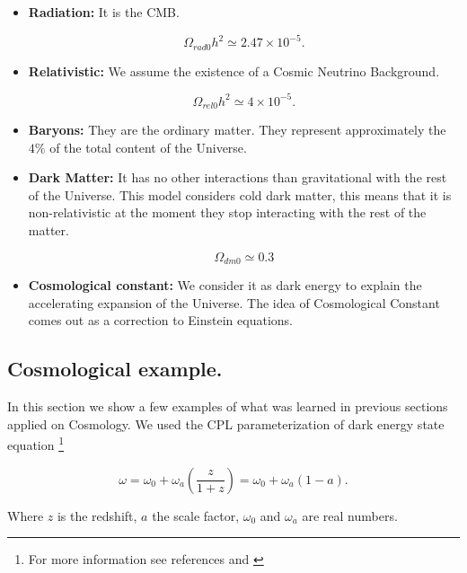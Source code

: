 \documentclass[onecolumn,           %
               showpacs,            %
               preprintnumbers,     %
               aps,                 %
               prl,          	    %
               letterpaper,             %
               superscriptaddress,      %
               nofootinbib,         %
               tightenlines,        %
               floats,floatfix      %
               ,usenatbib,
               ]{revtex4-1}
\begin{document}
\begin{itemize}
	\item \textbf{Radiation:} It is the CMB.
	
	\begin{equation}
	\Omega_{rad 0}h^2 \simeq 2.47 \times 10^{-5} .
	\end{equation}
	
	\item \textbf{Relativistic:} We assume the existence of a Cosmic Neutrino Background.
	
	\begin{equation}
	\Omega_{rel 0}h^2 \simeq 4 \times 10^{-5} .
	\end{equation}
	
	\item \textbf{Baryons:} They are the ordinary matter. They represent approximately the $4 \%$ of the total content of the Universe.
	
	\item \textbf{Dark Matter:} It has no other interactions than gravitational with the rest of the Universe. This model considers cold dark matter, this means that it is non-relativistic at the moment they stop interacting with the rest of the matter.
	
	\begin{equation}
	\Omega_{dm 0} \simeq 0.3
	\end{equation}
	
	\item \textbf{Cosmological constant:} We consider it as dark energy to explain the accelerating expansion of the Universe. The idea of Cosmological Constant comes out as a correction to Einstein equations.
\end{itemize}

\subsection{Cosmological example.}
In this section we show a few examples of what was learned in previous sections applied on Cosmology. We used the CPL parameterization of dark energy state equation \footnote{For more information see references \cite{CPL1} and \cite{CPL2}} 

\begin{equation}
\omega = \omega_0 + \omega_a\left(\frac{z}{1 + z}\right) = \omega_0 + \omega_a\left(1 - a\right).
\end{equation}

Where $z$ is the redshift, $a$ the scale factor, $\omega_0$ and $\omega_a$ are real numbers.
\end{document}
